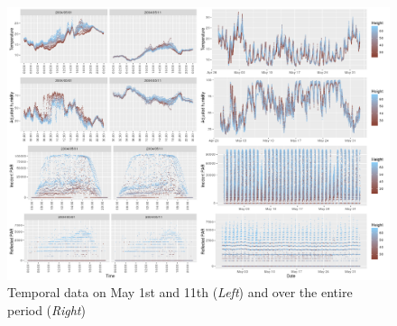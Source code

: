 \documentclass[11pt]{article}
\begin{document}
\begin{figure}[!hbt]
  \centering
    \includegraphics[width=1\textwidth]{../figures/comp111.png}
  \caption{Temporal data on May 1st and 11th (\textit{Left}) and over the entire period (\textit{Right})}
  \label{fig:comp111}
\end{figure}
\end{document}

